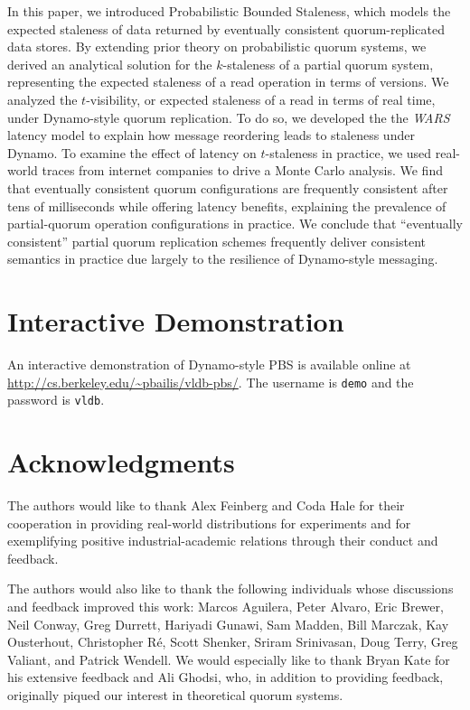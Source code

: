 \documentclass{vldb}
\newcommand{\sectionskip}{-0em}
\begin{document}
In this paper, we introduced Probabilistic Bounded Staleness, which
models the expected staleness of data returned by eventually
consistent quorum-replicated data stores.  By extending prior theory
on probabilistic quorum systems, we derived an analytical solution for
the $k$-staleness of a partial quorum system, representing the
expected staleness of a read operation in terms of versions.  We
analyzed the $t$-visibility, or expected staleness of a read in terms
of real time, under Dynamo-style quorum replication.  To do so, we
developed the the \textit{WARS} latency model to explain how message
reordering leads to staleness under Dynamo.  To examine the effect of
latency on $t$-staleness in practice, we used real-world traces from
internet companies to drive a Monte Carlo analysis.  We find that
eventually consistent quorum configurations are frequently consistent
after tens of milliseconds while offering latency benefits, explaining
the prevalence of partial-quorum operation configurations in practice.
We conclude that ``eventually consistent'' partial quorum replication
schemes frequently deliver consistent semantics in practice due
largely to the resilience of Dynamo-style messaging.

\vspace{\sectionskip}\section*{Interactive Demonstration}
An interactive demonstration of Dynamo-style PBS is available online
at \url{http://cs.berkeley.edu/~pbailis/vldb-pbs/}.  The username is
\texttt{demo} and the password is \texttt{vldb}.

\section*{Acknowledgments}

The authors would like to thank Alex Feinberg and Coda Hale for their
cooperation in providing real-world distributions for experiments and
for exemplifying positive industrial-academic relations through their
conduct and feedback.

The authors would also like to thank the following individuals whose
discussions and feedback improved this work: Marcos Aguilera, Peter
Alvaro, Eric Brewer, Neil Conway, Greg Durrett, Hariyadi Gunawi, Sam
Madden, Bill Marczak, Kay Ousterhout, Christopher R\'e, Scott Shenker,
Sriram Srinivasan, Doug Terry, Greg Valiant, and Patrick Wendell.  We
would especially like to thank Bryan Kate for his extensive feedback
and Ali Ghodsi, who, in addition to providing feedback, originally
piqued our interest in theoretical quorum systems.
\end{document}
